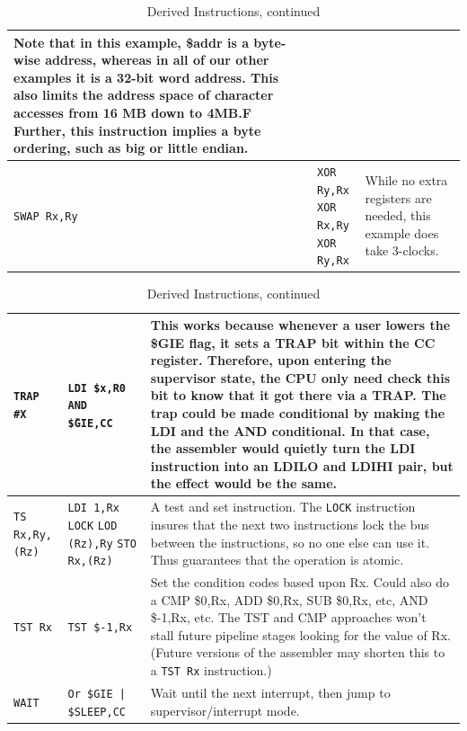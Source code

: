 \documentclass{gqtekspec}
\begin{document}
\begin{table}
\begin{center}
\begin{tabular}{p{1.4in}p{1.5in}p{3in}}
{	Note that in this example, \$addr is a
	byte-wise address, whereas in all of our other examples it is a 
	32-bit word address. This also limits the address space
	of character accesses from 16 MB down to 4MB.F
	Further, this instruction implies a byte ordering,
	such as big or little endian.} \\\hline
{\tt SWAP Rx,Ry }
	& \parbox[t]{1.5in}{\tt XOR Ry,Rx \\ XOR Rx,Ry \\ XOR Ry,Rx} 
	& While no extra registers are needed, this example
	does take 3-clocks. \\\hline
\end{tabular}
\caption{Derived Instructions, continued}\label{tbl:derived-3}
\end{center}\end{table}
\begin{table}\begin{center}
\begin{tabular}{p{1.4in}p{1.5in}p{3in}}\\\hline
{\tt TRAP \#X}
	& \parbox[t]{1.5in}{\tt LDI \$x,R0 \\ AND \~\$GIE,CC }
	& This works because whenever a user lowers the \$GIE flag, it sets
	a TRAP bit within the CC register.  Therefore, upon entering the 
	supervisor state, the CPU only need check this bit to know that it
	got there via a TRAP.  The trap could be made conditional by making
	the LDI and the AND conditional.  In that case, the assembler would
	quietly turn the LDI instruction into an LDILO and LDIHI pair,
	but the effect would be the same. \\\hline
{\tt TS Rx,Ry,(Rz)}
	& \hbox{\tt LDI 1,Rx}
		\hbox{\tt LOCK}
		\hbox{\tt LOD (Rz),Ry}
		\hbox{\tt STO Rx,(Rz)}
	& A test and set instruction.  The {\tt LOCK} instruction insures
	that the next two instructions lock the bus between the instructions,
	so no one else can use it.  Thus guarantees that the operation is
	atomic.
	\\\hline
{\tt TST Rx}
	& {\tt TST \$-1,Rx}
	& Set the condition codes based upon Rx.  Could also do a CMP \$0,Rx,
	ADD \$0,Rx, SUB \$0,Rx, etc, AND \$-1,Rx, etc.  The TST and CMP 
	approaches won't stall future pipeline stages looking for the value
	of Rx. (Future versions of the assembler may shorten this to a 
	{\tt TST Rx} instruction.)\\\hline
{\tt WAIT}
	& {\tt Or \$GIE | \$SLEEP,CC}
	& Wait until the next interrupt, then jump to supervisor/interrupt
	mode.
\end{tabular}
\caption{Derived Instructions, continued}\label{tbl:derived-4}
\end{center}\end{table}
\end{document}
